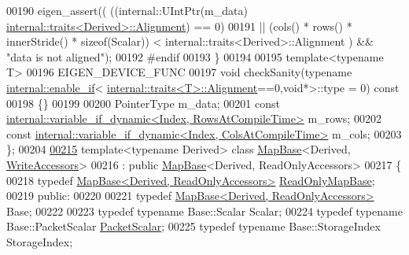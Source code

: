 \begin{DoxyCode}
00190       eigen\_assert((   ((internal::UIntPtr(m\_data) %
      \hyperlink{struct_eigen_1_1internal_1_1traits}{internal::traits<Derived>::Alignment}) == 0)
00191                     || (cols() * rows() * innerStride() * \textcolor{keyword}{sizeof}(Scalar)) < 
      internal::traits<Derived>::Alignment ) && \textcolor{stringliteral}{"data is not aligned"});
00192 \textcolor{preprocessor}{#endif}
00193     \}
00194 
00195     \textcolor{keyword}{template}<\textcolor{keyword}{typename} T>
00196     EIGEN\_DEVICE\_FUNC
00197     \textcolor{keywordtype}{void} checkSanity(\textcolor{keyword}{typename} \hyperlink{struct_eigen_1_1internal_1_1enable__if}{internal::enable\_if}<
      \hyperlink{struct_eigen_1_1internal_1_1traits}{internal::traits<T>::Alignment}==0,\textcolor{keywordtype}{void}*>::type = 0)\textcolor{keyword}{ const}
00198 \textcolor{keyword}{    }\{\}
00199 
00200     PointerType m\_data;
00201     \textcolor{keyword}{const} \hyperlink{class_eigen_1_1internal_1_1variable__if__dynamic}{internal::variable\_if\_dynamic<Index, RowsAtCompileTime>}
       m\_rows;
00202     \textcolor{keyword}{const} \hyperlink{class_eigen_1_1internal_1_1variable__if__dynamic}{internal::variable\_if\_dynamic<Index, ColsAtCompileTime>}
       m\_cols;
00203 \};
00204 
\hyperlink{group___core___module}{00215} \textcolor{keyword}{template}<\textcolor{keyword}{typename} Derived> \textcolor{keyword}{class }\hyperlink{class_eigen_1_1_map_base}{MapBase}<Derived, \hyperlink{group__enums_gga9f93eac38eb83deb0e8dbd42ddf11d5da2c59ef3697d65866c3a8e16eda7881ab}{WriteAccessors}>
00216   : \textcolor{keyword}{public} \hyperlink{class_eigen_1_1_map_base}{MapBase}<Derived, ReadOnlyAccessors>
00217 \{
00218     \textcolor{keyword}{typedef} \hyperlink{group___core___module_class_eigen_1_1_map_base_3_01_derived_00_01_read_only_accessors_01_4}{MapBase<Derived, ReadOnlyAccessors>} 
      \hyperlink{group___core___module_class_eigen_1_1_map_base_3_01_derived_00_01_read_only_accessors_01_4}{ReadOnlyMapBase};
00219   \textcolor{keyword}{public}:
00220 
00221     \textcolor{keyword}{typedef} \hyperlink{group___core___module_class_eigen_1_1_map_base_3_01_derived_00_01_read_only_accessors_01_4}{MapBase<Derived, ReadOnlyAccessors>} Base;
00222 
00223     \textcolor{keyword}{typedef} \textcolor{keyword}{typename} Base::Scalar Scalar;
00224     \textcolor{keyword}{typedef} \textcolor{keyword}{typename} Base::PacketScalar \hyperlink{group___sparse_core___module}{PacketScalar};
00225     \textcolor{keyword}{typedef} \textcolor{keyword}{typename} Base::StorageIndex StorageIndex;

\end{DoxyCode}
